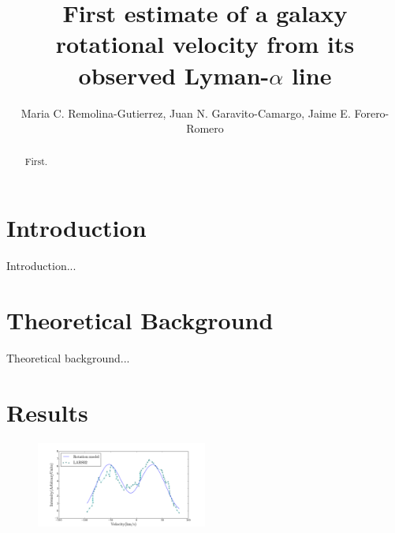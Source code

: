 \documentclass{emulateapj}
\begin{document}
\title{First estimate of a galaxy rotational velocity from
  its observed Lyman-$\alpha$ line} 


\author{ Maria C. Remolina-Gutierrez, Juan N. Garavito-Camargo, Jaime
  E. Forero-Romero}  

\begin{abstract}
First.
\end{abstract}


\section{Introduction}
\label{sec:intro}

Introduction... \\ 
\cite{Garavito14}


\section{Theoretical Background}
\label{sec:theo}

Theoretical background...\\


\section{Results}
\label{sec:results}


\begin{figure}
\begin{center}
  \includegraphics[width=0.5\textwidth]{mcmc.png}
\end{center}
\caption{
    \label{fig:mcmc_result}}  
\end{figure}
\end{document}
